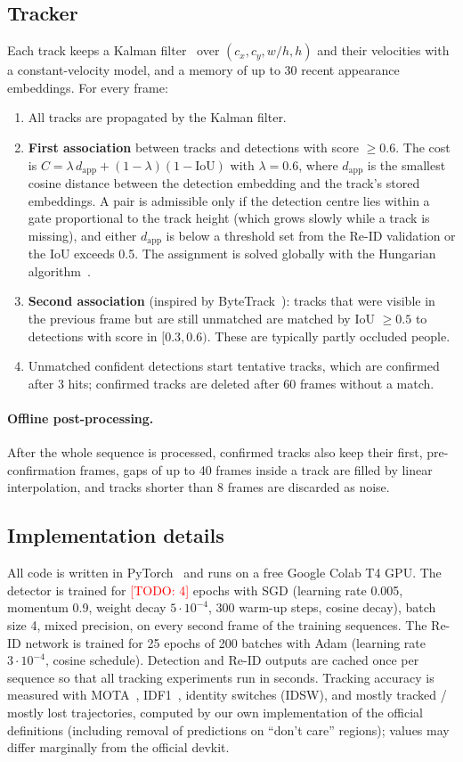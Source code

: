 \documentclass[11pt,letterpaper]{article}
\newcommand{\todo}[1]{\textcolor{red}{[TODO: #1]}}
\begin{document}
\subsection{Tracker}
Each track keeps a Kalman filter~\cite{kalman1960} over $(c_x, c_y, w/h, h)$ and their velocities with a constant-velocity model, and a memory of up to 30 recent appearance embeddings. For every frame:
\begin{enumerate}
\item All tracks are propagated by the Kalman filter.
\item \textbf{First association} between tracks and detections with score $\ge 0.6$. The cost is $C = \lambda\, d_{\text{app}} + (1-\lambda)(1-\text{IoU})$ with $\lambda=0.6$, where $d_{\text{app}}$ is the smallest cosine distance between the detection embedding and the track's stored embeddings. A pair is admissible only if the detection centre lies within a gate proportional to the track height (which grows slowly while a track is missing), and either $d_{\text{app}}$ is below a threshold set from the Re-ID validation or the IoU exceeds 0.5. The assignment is solved globally with the Hungarian algorithm~\cite{kuhn1955hungarian}.
\item \textbf{Second association} (inspired by ByteTrack~\cite{zhang2022bytetrack}): tracks that were visible in the previous frame but are still unmatched are matched by IoU $\ge0.5$ to detections with score in $[0.3, 0.6)$. These are typically partly occluded people.
\item Unmatched confident detections start tentative tracks, which are confirmed after 3 hits; confirmed tracks are deleted after 60 frames without a match.
\end{enumerate}
\paragraph{Offline post-processing.} After the whole sequence is processed, confirmed tracks also keep their first, pre-confirmation frames, gaps of up to 40 frames inside a track are filled by linear interpolation, and tracks shorter than 8 frames are discarded as noise.

\subsection{Implementation details}
All code is written in PyTorch~\cite{paszke2019pytorch} and runs on a free Google Colab T4 GPU. The detector is trained for \todo{4} epochs with SGD (learning rate 0.005, momentum 0.9, weight decay $5\cdot10^{-4}$, 300 warm-up steps, cosine decay), batch size 4, mixed precision, on every second frame of the training sequences. The Re-ID network is trained for 25 epochs of 200 batches with Adam (learning rate $3\cdot10^{-4}$, cosine schedule). Detection and Re-ID outputs are cached once per sequence so that all tracking experiments run in seconds. Tracking accuracy is measured with MOTA~\cite{bernardin2008clear}, IDF1~\cite{ristani2016idf1}, identity switches (IDSW), and mostly tracked / mostly lost trajectories, computed by our own implementation of the official definitions (including removal of predictions on ``don't care'' regions); values may differ marginally from the official devkit.
\end{document}
